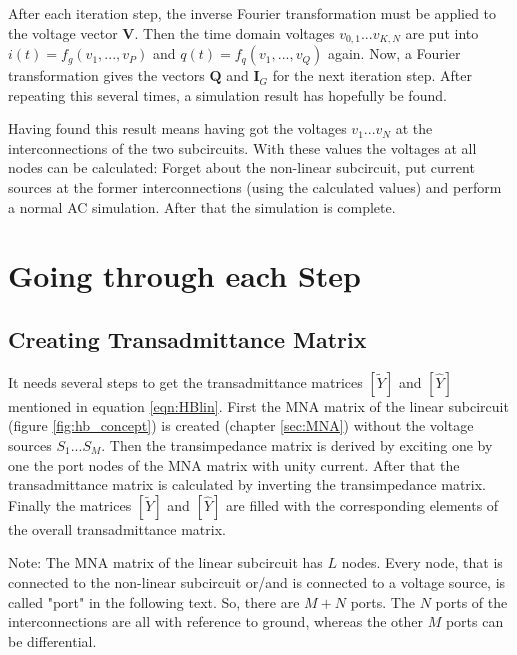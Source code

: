 \addvspace{12pt}

After each iteration step, the inverse Fourier transformation must
be applied to the voltage vector $\boldsymbol{V}$. Then the time domain
voltages $v_{0,1}...v_{K,N}$ are put into $i(t) = f_g(v_1, ..., v_P)$
and $q(t) = f_q(v_1, ..., v_Q)$ again. Now, a Fourier transformation
gives the vectors $\boldsymbol{Q}$ and $\boldsymbol{I}_G$ for the
next iteration step. After repeating this several times, a simulation
result has hopefully be found.

\addvspace{12pt}

Having found this result means having got the voltages $v_1...v_N$ at
the interconnections of the two subcircuits. With these values the
voltages at all nodes can be calculated: Forget about the non-linear
subcircuit, put current sources at the former interconnections (using
the calculated values) and perform a normal AC simulation. After that
the simulation is complete.

\section{Going through each Step}

\subsection{Creating Transadmittance Matrix}

It needs several steps to get the transadmittance matrices $[\tilde{Y}]$
and $[\hat{Y}]$ mentioned in equation \eqref{eqn:HBlin}. First the MNA
matrix of the linear subcircuit (figure \ref{fig:hb_concept}) is created
(chapter \ref{sec:MNA}) without the voltage sources $S_1$...$S_M$. Then
the transimpedance matrix is derived by
exciting one by one the port nodes of the MNA matrix with unity current.
After that the transadmittance matrix is calculated by inverting the
transimpedance matrix. Finally the matrices $[\tilde{Y}]$ and $[\hat{Y}]$
are filled with the corresponding elements of the overall transadmittance
matrix.

\addvspace{12pt}

Note: The MNA matrix of the linear subcircuit has $L$ nodes.
Every node, that is connected to the non-linear subcircuit or/and is
connected to a voltage source, is called "port" in the following text.
So, there are $M+N$ ports. The $N$ ports of the interconnections are
all with reference to ground, whereas the other $M$ ports can be
differential.

